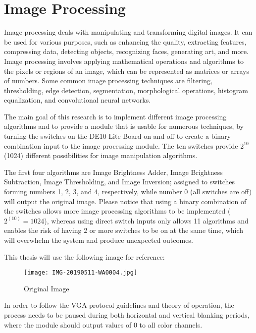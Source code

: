 \section{Image Processing}
\par Image processing deals with manipulating and transforming digital images. It can be used for various purposes, such as enhancing the quality, extracting features, compressing data, detecting objects, recognizing faces, generating art, and more. Image processing involves applying mathematical operations and algorithms to the pixels or regions of an image, which can be represented as matrices or arrays of numbers. Some common image processing techniques are filtering, thresholding, edge detection, segmentation, morphological operations, histogram equalization, and convolutional neural networks. \newline
\par The main goal of this research is to implement different image processing algorithms and to provide a module that is usable for numerous techniques, by turning the switches on the DE10-Lite Board on and off to create a binary combination input to the image processing module. The ten switches provide $2^{10}$ (1024) different possibilities for image manipulation algorithms. \newline
\par The first four algorithms are Image Brightness Adder, Image Brightness Subtraction, Image Thresholding, and Image Inversion; assigned to switches forming numbers 1, 2, 3, and 4, respectively, while number 0 (all switches are off) will output the original image. Please notice that using a binary combination of the switches allows more image processing algorithms to be implemented ($2^(10) = 1024$), whereas using direct switch inputs only allows 11 algorithms and enables the risk of having 2 or more switches to be on at the same time, which will overwhelm the system and produce unexpected outcomes. \newline
\par This thesis will use the following image for reference:\newline 
\begin{figure}[H]
    \centering
    \texttt{[image: IMG-20190511-WA0004.jpg]}
    \caption{Original Image}
    \label{fig:imageOriginal}  
\end{figure}
\par In order to follow the VGA protocol guidelines and theory of operation, the process needs to be paused during both horizontal and vertical blanking periods, where the module should output values of 0 to all color channels. \newline

